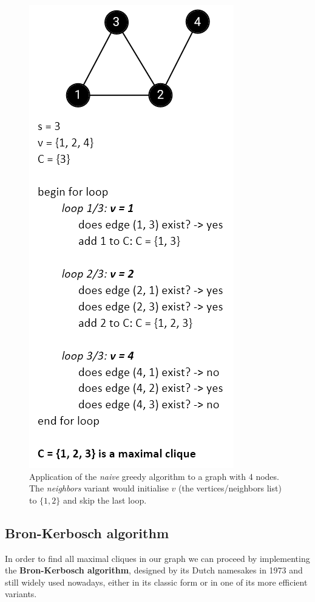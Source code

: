 \documentclass[11pt]{article}
\begin{document}
\begin{figure}[h]
\centering
\includegraphics[scale=0.7]{img/ex_greedy.png}
\caption{Application of the \textit{naive} greedy algorithm to a graph with 4 nodes. The \textit{neighbors} variant would initialise $v$ (the vertices/neighbors list) to $\{1, 2\}$ and skip the last loop.}
\label{fig:greedy}
\end{figure}
    
\subsection{Bron-Kerbosch algorithm}\label{bron-kerbosch-algorithm}

In order to find all maximal cliques in our graph we can proceed by
implementing the \textbf{Bron-Kerbosch
algorithm}\cite{bk_classic},
designed by its Dutch namesakes in 1973 and still widely used nowadays,
either in its classic form or in one of its more efficient variants.
\end{document}
